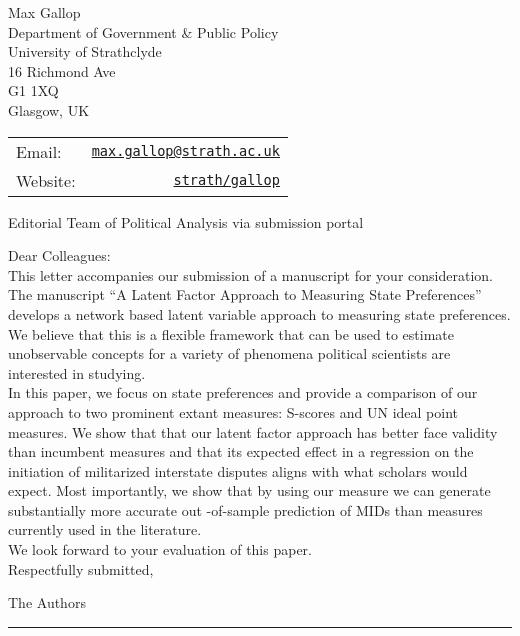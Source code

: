 \documentclass[letterpaper]{article}
\begin{document}
\thispagestyle{empty}

  
  
  \begin{minipage}{0.64\linewidth}
Max Gallop \\
Department of Government \& Public Policy \\
University of Strathclyde \\
16 Richmond Ave \\
G1 1XQ \\
Glasgow, UK
\end{minipage}
\begin{minipage}{0.45\linewidth}
  \begin{tabular}{lr}
    Email: & \href{mailto:max.gallop@strath.ac.uk}{\tt max.gallop@strath.ac.uk}  \\
    Website:& \href{https://www.strath.ac.uk/staff/gallopmaxmr/}{\tt strath/gallop}
  \end{tabular}
\end{minipage}
  
\vspace{1.5in}

{Editorial Team of Political Analysis via submission portal}

\vspace{0.5in}

Dear Colleagues:\\[1ex]

This letter accompanies our submission of a manuscript for your consideration. The manuscript ``A Latent Factor Approach to Measuring State Preferences'' develops a network based latent variable approach to measuring state preferences. We believe that this is a flexible framework that can be used to estimate unobservable concepts for a variety of phenomena political scientists are interested in studying.  \\[1ex]

In this paper, we focus on state preferences and provide a comparison of our approach to two prominent extant measures: S-scores and UN ideal point measures. We show that that our latent factor approach has better face validity than incumbent measures and that its expected effect in a regression on the initiation of militarized interstate disputes aligns with what scholars would expect. Most importantly, we show that by using our measure we can generate substantially more accurate out -of-sample prediction of MIDs than measures currently used in the literature. \\[1ex]

We look forward to your evaluation of this paper.\\[1ex]

Respectfully submitted,

\vspace{.1in}

The Authors

\vskip 0.5in
\hrule
\end{document}
